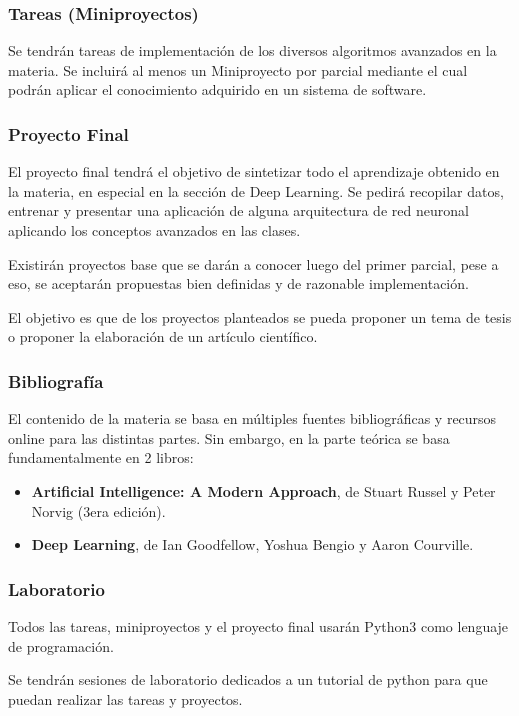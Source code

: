 \documentclass[10pt]{beamer}
\begin{document}
\begin{frame}
    \frametitle{Tareas (Miniproyectos)}
    Se tendrán tareas de implementación de los diversos algoritmos avanzados 
    en la materia. Se incluirá al menos un Miniproyecto por parcial mediante el cual podrán 
    aplicar el conocimiento adquirido en un sistema de software.

   
\end{frame}

\begin{frame}
    \frametitle{Proyecto Final}

    El proyecto final tendrá el objetivo de sintetizar todo el aprendizaje obtenido en la materia, 
    en especial en la sección de Deep Learning. Se pedirá recopilar datos, entrenar y presentar 
    una aplicación de alguna arquitectura de red neuronal aplicando los conceptos avanzados en 
    las clases. 

    Existirán proyectos base que se darán a conocer luego del primer parcial, pese a eso, 
    se aceptarán propuestas bien definidas y de razonable implementación. 

    El objetivo es que de los proyectos planteados se pueda proponer un tema de tesis o proponer
    la elaboración de un artículo científico.

\end{frame}

\begin{frame}
    \frametitle{Bibliografía}
    El contenido de la materia se basa en múltiples fuentes bibliográficas y recursos online 
    para las distintas partes. Sin embargo, en la parte teórica se basa fundamentalmente en 2 libros:

    \begin{itemize}
        \item \textbf{Artificial Intelligence: A Modern Approach}, de Stuart Russel y Peter Norvig (3era edición).
        \item \textbf{Deep Learning}, de Ian Goodfellow, Yoshua Bengio y Aaron Courville.
    \end{itemize}

\end{frame}


\begin{frame}

    \frametitle{Laboratorio}
    Todos las tareas, miniproyectos y el proyecto final usarán Python3 como lenguaje 
    de programación.

    Se tendrán sesiones de laboratorio dedicados a un tutorial de python para que puedan
    realizar las tareas y proyectos.

\end{frame}
\end{document}
